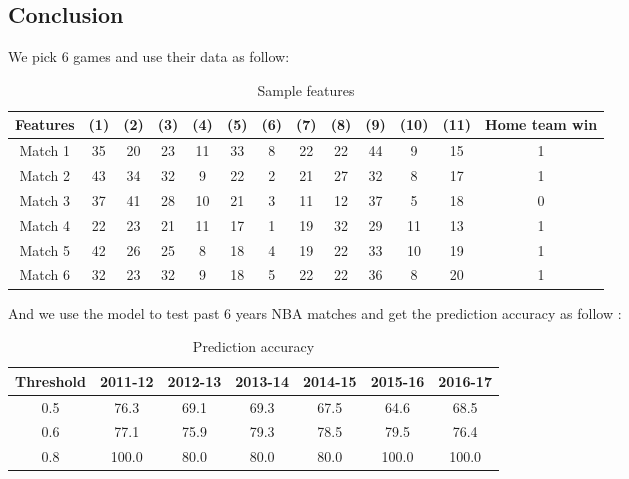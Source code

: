 \documentclass[sigconf]{acmart}
\begin{document}
\subsection{Conclusion}
We pick 6 games and use their data as follow:
\begin{table}[!hbp]
\begin{tabular}{|c|c|c|c|c|c|c|c|c|c|c|c|c|}
\hline
\hline
Features & (1) & (2) & (3) & (4) & (5) & (6) & (7) & (8) & (9) & (10) & (11) & Home team win \\
\hline
Match 1 & 35 & 20 & 23 & 11 & 33 & 8& 22 & 22 & 44 & 9 & 15 & 1\\
\hline
Match 2 & 43 & 34 & 32 & 9 & 22 & 2 & 21 & 27 & 32 & 8 & 17 & 1\\
\hline
Match 3 & 37 & 41 & 28 & 10 & 21 & 3 & 11 & 12 & 37 & 5 & 18 & 0\\
\hline
Match 4 & 22 & 23 & 21 & 11 & 17 & 1 & 19 & 32 & 29 & 11 & 13 & 1\\
\hline
Match 5 & 42 & 26 & 25 & 8 & 18 & 4 & 19 & 22 & 33 & 10 & 19 & 1\\
\hline
Match 6 & 32 & 23 & 32 & 9 & 18 & 5 & 22 & 22 & 36 & 8 & 20 & 1\\
\hline
\end{tabular}
\caption{Sample features}
\end{table} 
And we use the model to test past 6 years NBA matches and get the prediction accuracy as follow :
\begin{table}[]
    \centering
    \begin{tabular}{c|c|c|c|c|c|c}
         \hline
         Threshold & 2011-12 & 2012-13 & 2013-14 & 2014-15 & 2015-16 & 2016-17\\
         \hline
         0.5 & 76.3 & 69.1 & 69.3 & 67.5 & 64.6 & 68.5\\
         \hline
         0.6 & 77.1 & 75.9 & 79.3 & 78.5 & 79.5 & 76.4\\
         \hline 
         0.8 & 100.0 & 80.0 & 80.0 & 80.0 & 100.0 & 100.0\\
    \end{tabular}
    \caption{Prediction accuracy}
    \label{Prediction accuracy}
\end{table}

 
\end{document}
